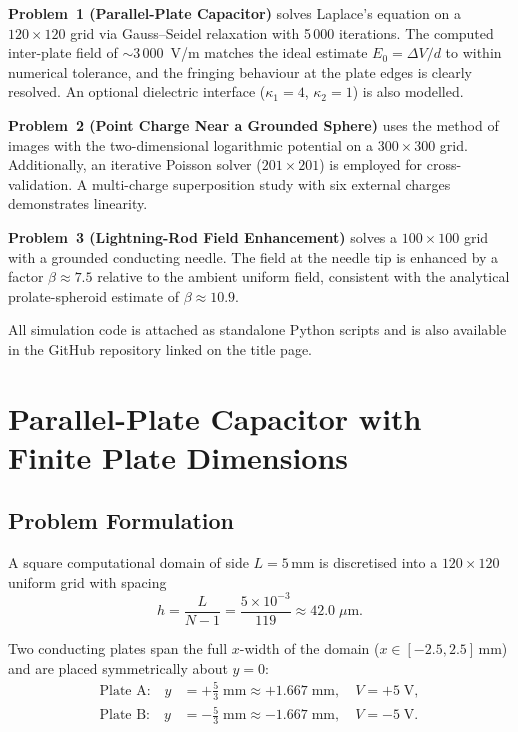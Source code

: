 \documentclass[11pt,a4paper]{article}
\begin{document}
\textbf{Problem~1 (Parallel-Plate Capacitor)} solves Laplace's equation on a $120\times120$ grid via Gauss--Seidel relaxation with 5\,000 iterations. The computed inter-plate field of ${\sim}3\,000$~V/m matches the ideal estimate $E_0 = \Delta V / d$ to within numerical tolerance, and the fringing behaviour at the plate edges is clearly resolved. An optional dielectric interface ($\kappa_1 = 4$, $\kappa_2 = 1$) is also modelled.

\textbf{Problem~2 (Point Charge Near a Grounded Sphere)} uses the method of images with the two-dimensional logarithmic potential on a $300\times300$ grid. Additionally, an iterative Poisson solver ($201\times201$) is employed for cross-validation. A multi-charge superposition study with six external charges demonstrates linearity.

\textbf{Problem~3 (Lightning-Rod Field Enhancement)} solves a $100\times100$ grid with a grounded conducting needle. The field at the needle tip is enhanced by a factor $\beta \approx 7.5$ relative to the ambient uniform field, consistent with the analytical prolate-spheroid estimate of $\beta \approx 10.9$.

All simulation code is attached as standalone Python scripts and is also available in the GitHub repository linked on the title page.

\newpage

\section{Parallel-Plate Capacitor with Finite Plate Dimensions}

\subsection{Problem Formulation}

A square computational domain of side $L = 5$\,mm is discretised into a $120 \times 120$ uniform grid with spacing
\begin{equation}
h = \frac{L}{N-1} = \frac{5 \times 10^{-3}}{119} \approx 42.0\;\mu\text{m}.
\end{equation}

Two conducting plates span the full $x$-width of the domain ($x \in [-2.5, 2.5]$\,mm) and are placed symmetrically about $y=0$:
\begin{align}
\text{Plate A:} \quad y &= +\frac{5}{3}\;\text{mm} \approx +1.667\;\text{mm}, \quad V = +5\;\text{V}, \\
\text{Plate B:} \quad y &= -\frac{5}{3}\;\text{mm} \approx -1.667\;\text{mm}, \quad V = -5\;\text{V}.
\end{align}
\end{document}
